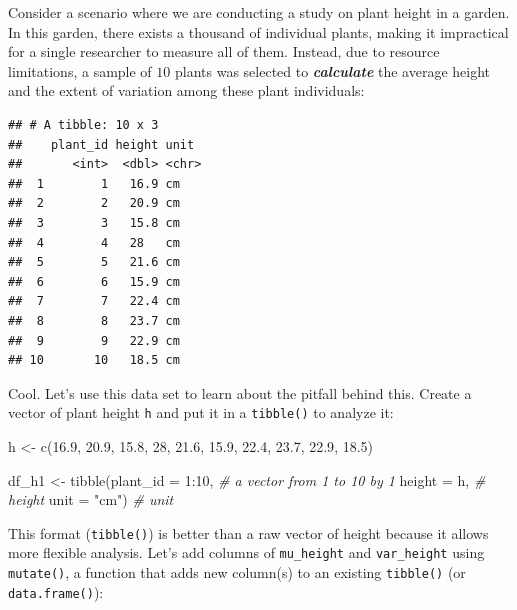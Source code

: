 \documentclass[
]{book}
\newenvironment{Shaded}{\begin{snugshade}}{\end{snugshade}}
\newcommand{\AttributeTok}[1]{\textcolor[rgb]{0.77,0.63,0.00}{#1}}
\newcommand{\CommentTok}[1]{\textcolor[rgb]{0.56,0.35,0.01}{\textit{#1}}}
\newcommand{\DecValTok}[1]{\textcolor[rgb]{0.00,0.00,0.81}{#1}}
\newcommand{\FloatTok}[1]{\textcolor[rgb]{0.00,0.00,0.81}{#1}}
\newcommand{\FunctionTok}[1]{\textcolor[rgb]{0.00,0.00,0.00}{#1}}
\newcommand{\NormalTok}[1]{#1}
\newcommand{\OtherTok}[1]{\textcolor[rgb]{0.56,0.35,0.01}{#1}}
\newcommand{\SpecialCharTok}[1]{\textcolor[rgb]{0.00,0.00,0.00}{#1}}
\newcommand{\StringTok}[1]{\textcolor[rgb]{0.31,0.60,0.02}{#1}}
\begin{document}
Consider a scenario where we are conducting a study on plant height in a garden. In this garden, there exists a thousand of individual plants, making it impractical for a single researcher to measure all of them. Instead, due to resource limitations, a sample of \(10\) plants was selected to \textbf{\emph{calculate}} the average height and the extent of variation among these plant individuals:

\begin{verbatim}
## # A tibble: 10 x 3
##    plant_id height unit 
##       <int>  <dbl> <chr>
##  1        1   16.9 cm   
##  2        2   20.9 cm   
##  3        3   15.8 cm   
##  4        4   28   cm   
##  5        5   21.6 cm   
##  6        6   15.9 cm   
##  7        7   22.4 cm   
##  8        8   23.7 cm   
##  9        9   22.9 cm   
## 10       10   18.5 cm
\end{verbatim}

Cool. Let's use this data set to learn about the pitfall behind this. Create a vector of plant height \texttt{h} and put it in a \texttt{tibble()} to analyze it:

\begin{Shaded}
\begin{Highlighting}[]
\NormalTok{h }\OtherTok{\textless{}{-}} \FunctionTok{c}\NormalTok{(}\FloatTok{16.9}\NormalTok{, }\FloatTok{20.9}\NormalTok{, }\FloatTok{15.8}\NormalTok{, }\DecValTok{28}\NormalTok{, }\FloatTok{21.6}\NormalTok{, }\FloatTok{15.9}\NormalTok{, }\FloatTok{22.4}\NormalTok{, }\FloatTok{23.7}\NormalTok{, }\FloatTok{22.9}\NormalTok{, }\FloatTok{18.5}\NormalTok{)}

\NormalTok{df\_h1 }\OtherTok{\textless{}{-}} \FunctionTok{tibble}\NormalTok{(}\AttributeTok{plant\_id =} \DecValTok{1}\SpecialCharTok{:}\DecValTok{10}\NormalTok{, }\CommentTok{\# a vector from 1 to 10 by 1}
                \AttributeTok{height =}\NormalTok{ h, }\CommentTok{\# height}
                \AttributeTok{unit =} \StringTok{"cm"}\NormalTok{) }\CommentTok{\# unit}
\end{Highlighting}
\end{Shaded}

This format (\texttt{tibble()}) is better than a raw vector of height because it allows more flexible analysis. Let's add columns of \texttt{mu\_height} and \texttt{var\_height} using \texttt{mutate()}, a function that adds new column(s) to an existing \texttt{tibble()} (or \texttt{data.frame()}):
\end{document}
